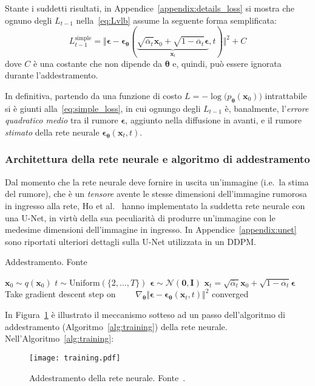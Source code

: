 \noindent Stante i suddetti risultati, in Appendice~\ref{appendix:details_loss} si mostra che ognuno degli $L_{t-1}$ nella~\eqref{eq:Lvlb} 
assume la seguente forma semplificata:
\begin{equation}
    L_{t-1}^{\text{simple}}=\Vert \bm{\epsilon}-
    \bm{\epsilon}_{\bm{\theta}}(\underbrace{\sqrt{\overline{\alpha}_t}\mathbf{x}_0+\sqrt{1-\overline{\alpha}_t}\bm{\epsilon}}_{\mathbf{x}_t},t)\Vert^2 +C
    \label{eq:simple_loss}
\end{equation}
dove $C$ è una costante che non dipende da $\bm{\theta}$ e, quindi, può essere ignorata durante l'addestramento.

In definitiva, partendo da una funzione di costo $L=-\log\bigl(p_{\bm{\theta}}(\mathbf{x}_0)\bigr)$ intrattabile 
si è giunti alla~\eqref{eq:simple_loss}, in cui ognungo degli $L_{t-1}$ è, banalmente, l'\emph{errore quadratico medio} tra il rumore $\bm{\epsilon}$, aggiunto nella diffusione in avanti, e 
il rumore \emph{stimato} della rete neurale $\bm{\epsilon}_{\bm{\theta}}(\mathbf{x}_t,t)$.


\subsubsection{Architettura della rete neurale e algoritmo di addestramento}
Dal momento che la rete neurale deve fornire in uscita un'immagine (i.e.\ la stima del rumore), 
che è un \emph{tensore} avente le stesse dimensioni dell'immagine rumorosa in ingresso alla rete, 
Ho et al.~\cite{ho2020} hanno implementato la suddetta rete neurale con una U-Net, in virtù della sua peculiarità di produrre un'immagine 
con le medesime dimensioni dell'immagine in ingresso.
In Appendice~\ref{appendix:unet} sono riportati ulteriori dettagli sulla U-Net utilizzata in un DDPM.
\begin{algorithm}[H]
    \caption{Addestramento. Fonte~\cite{ho2020}}\label{alg:training}
   \begin{algorithmic}[1]
    \Repeat    
   \State $\mathbf{x}_0 \sim q(\mathbf{x}_0)$\label{row:training1}
    \State $t \sim \text{Uniform$(\{2,...,T\})$}$\label{row:training2}
   \State $\boldsymbol{\epsilon}\sim \mathcal{N}(\bm{0},\bm{I})$\label{row:training3}
   \State $\mathbf{x}_t=\sqrt{\overline{\alpha}_t}\mathbf{x}_0+\sqrt{1-\overline{\alpha}_t}\bm{\epsilon}$\label{row:training4}
   \State Take gradient descent step on
    \State $\qquad \nabla_{\bm{\theta}} \Vert \bm{\epsilon}-\bm{\epsilon_{\theta}}(\mathbf{x}_t,t) \Vert^2$\label{row:training5}
    \Until converged
   \end{algorithmic}
\end{algorithm}
\noindent In Figura~\ref{fig:training} è illustrato il meccanismo sotteso ad un passo dell'algoritmo di addestramento (Algoritmo~\ref{alg:training}) 
della rete neurale. Nell'Algoritmo~\ref{alg:training}:
\begin{figure}
    \centering
    \texttt{[image: training.pdf]}
    \caption{Addestramento della rete neurale. Fonte~\cite{royBeginnerGuideDiffusion}.}
    \label{fig:training}
\end{figure}

